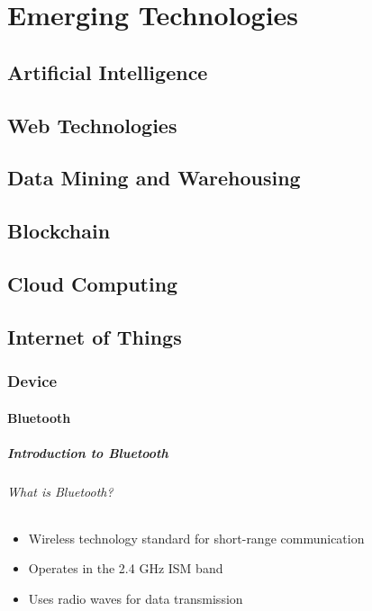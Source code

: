 \part{Emerging Technologies}
\chapter{Artificial Intelligence}
\chapter{Web Technologies}
\chapter{Data Mining and Warehousing}
\chapter{Blockchain}
\chapter{Cloud Computing}
\chapter{Internet of Things}
\section{Device}
\subsection{Bluetooth}
\subsubsection{Introduction to Bluetooth}
\paragraph{What is Bluetooth?}
\begin{itemize}
    \item Wireless technology standard for short-range communication
    \item Operates in the 2.4 GHz ISM band
    \item Uses radio waves for data transmission
\end{itemize}

